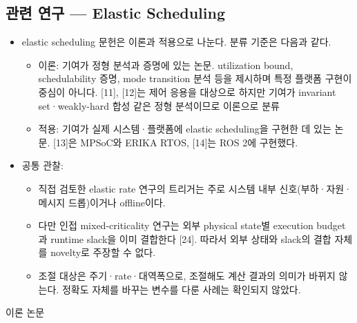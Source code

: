\documentclass[10pt]{article}
\begin{document}
\subsection{관련 연구 --- Elastic Scheduling}
\begin{itemize}
\item elastic scheduling 문헌은 이론과 적용으로 나눈다. 분류 기준은 다음과 같다.
\begin{itemize}
\item 이론: 기여가 정형 분석과 증명에 있는 논문. utilization bound, schedulability 증명, mode transition 분석 등을 제시하며 특정 플랫폼 구현이 중심이 아니다. [11], [12]는 제어 응용을 대상으로 하지만 기여가 invariant set·weakly-hard 합성 같은 정형 분석이므로 이론으로 분류
\item 적용: 기여가 실제 시스템·플랫폼에 elastic scheduling을 구현한 데 있는 논문. [13]은 MPSoC와 ERIKA RTOS, [14]는 ROS 2에 구현했다.
\end{itemize}
\item 공통 관찰:
\begin{itemize}
\item 직접 검토한 elastic rate 연구의 트리거는 주로 시스템 내부 신호(부하·자원·메시지 드롭)이거나 offline이다.
\item 다만 인접 mixed-criticality 연구는 외부 physical state별 execution budget과 runtime slack을 이미 결합한다 [24]. 따라서 외부 상태와 slack의 결합 자체를 novelty로 주장할 수 없다.
\item 조절 대상은 주기·rate·대역폭으로, 조절해도 계산 결과의 의미가 바뀌지 않는다. 정확도 자체를 바꾸는 변수를 다룬 사례는 확인되지 않았다.
\end{itemize}
\end{itemize}
\noindent 이론 논문
\end{document}
